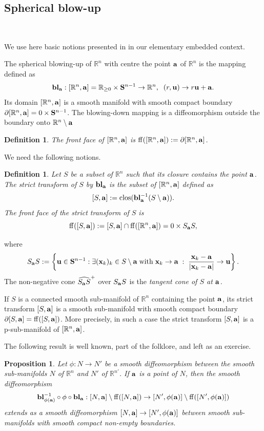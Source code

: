 \documentclass[11pt]{amsart}
\newtheorem{proposition}[theorem]{Proposition}
\newtheorem{definition}[theorem]{Definition}
\newcommand{\field}[1]{\mathbb{#1}}
\newcommand{\R}{\field{R}}
\newcommand{\wh}[1]{\widehat{#1}}
\newcommand{\ba}{{\bf a}}
\newcommand{\bbl}{{\bf bl}}
\newcommand{\bS}{{\bf S}}
\newcommand{\bu}{{\bf u}}
\newcommand{\bx}{{\bf x}}
\newcommand{\clos}{{\rm clos}}
\newcommand{\dd}{{\partial}}
\newcommand{\ff}{{\rm ff}}
\newcommand{\Rgo}{{\R_{\geq 0}}}
\newcommand{\Rn}{{\R^n}}
\numberwithin{equation}{section}
\numberwithin{equation}{section}
\begin{document}
\subsection{Spherical blow-up}
$ $

We use here basic notions presented in \cite{Mel} in our elementary embedded context.

The spherical blowing-up of $\Rn$ with centre the point $\ba$ of $\Rn$
is the mapping defined as
$$
\bbl_\ba :[\Rn,\ba] = \Rgo \times \bS^{n-1} \to \Rn, 
\;\; (r,\bu) \to r\bu + \ba.
$$
Its domain $[\Rn,\ba]$ is a smooth manifold with smooth compact 
boundary 
$\dd[\Rn,\ba] = 0\times \bS^{n-1}$. The blowing-down mapping 
is a diffeomorphism outside the boundary onto $\Rn\setminus \ba$
%
%
\begin{definition}\label{def:front-face}
	The \em front face \em of $[\Rn,\ba]$ is $\ff([\Rn,\ba]) := \dd[\Rn,\ba]$.
\end{definition}
%
%
We need the following notions.
%
%
\begin{definition}\label{def:strict-transform}
	Let $S$ be a subset of $\Rn$ such that its closure contains the 
	point $\ba$. The \em strict transform of $S$ by $\bbl_\ba$
	is the subset of $[\Rn,\ba]$ defined as
	$$
	[S,\ba]:=\clos(\bbl_\ba^{-1}(S\setminus\ba)).
	$$
	The \em front face \em of the strict transform of $S$ is 
	$$
	\ff([S,\ba]) := [S,\ba] \cap \ff([\Rn,\ba]) = 0\times S_\ba S,
	$$
\end{definition}
%
%
where 
$$
S_\ba S :=\left\{\bu \in \bS^{n-1} : \exists (\bx_k)_k\in S\setminus \ba 
\; {\rm with} \; \bx_k \to \ba \; : \; \frac{\bx_k-\ba}{|\bx_k - \ba|} 
\to \bu 
\right\}.
$$
The non-negative cone $\wh{S_\ba S}^+$ over $S_\ba S$ is the 
\em tangent cone of $S$ at $\ba$. \em 

\medskip
If $S$ is a connected smooth sub-manifold of $\Rn$ containing the point 
$\ba$, its strict transform $[S,\ba]$ is a smooth sub-manifold 
with smooth compact boundary $\dd[S,\ba] = \ff([S,\ba])$. More precisely, 
in such a case the strict transform $[S,\ba]$ is a p-sub-manifold of 
$[\Rn,\ba]$.
%
%

\medskip
The following result is well known, part of the folklore, and left as
an exercise.
%
%
\begin{proposition}\label{prop:blow-up-intrinsic}
	Let $\phi : N \to N'$ be a smooth diffeomorphism between the smooth
	sub-manifolds $N$ of $\Rn$ and $N'$ of $\R^{n'}$. If $\ba$ is a point
	of $N$, then the smooth diffeomorphism 
	$$
	\bbl_{\phi(\ba)}^{-1} \circ \phi \circ \bbl_\ba : [N,\ba] \setminus
	\ff ([N,\ba]) \to [N',\phi(\ba)] \setminus \ff ([N',\phi(\ba)])
	$$
	extends as a smooth diffeomorphism $[N,\ba] \to [N',\phi(\ba)]$ between
	smooth sub-manifolds with smooth compact non-empty boundaries.
\end{proposition}
\end{document}
